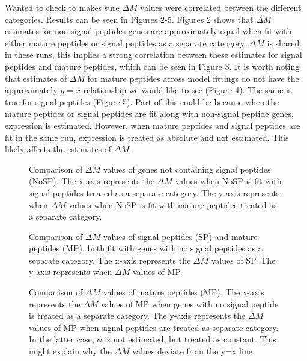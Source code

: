 \documentclass[11pt]{labbook}
\begin{document}
Wanted to check to makes sure $\Delta\mathit{M}$ values were correlated between the different categories. Results can be seen in Figures 2-5. Figures 2 shows that $\Delta\mathit{M}$ estimates for non-signal peptides genes are approximately equal when fit with either mature peptides or signal peptides as a separate cateogory. $\Delta\mathit{M}$ is shared in these runs, this implies a strong correlation between these estimates for signal peptides and mature peptides, which can be seen in Figure 3. It is worth noting that estimates of $\Delta\mathit{M}$ for mature peptides across model fittings do not have the approximately $y = x$ relationship we would like to see (Figure 4). The same is true for signal peptides (Figure 5). Part of this could be because when the mature peptides or signal peptides are fit along with non-signal peptide genes, expression is estimated. However, when mature peptides and signal peptides are fit in the same run, expression is treated as absolute and not estimated. This likely affects the estimates of $\Delta\mathit{M}$. \newline

\begin{figure}
\caption{Comparison of $\Delta\mathit{M}$ values of genes not containing signal peptides (NoSP). The x-axis represents the $\Delta\mathit{M}$ values when NoSP is fit with signal peptides treated as a separate category. The y-axis represents when $\Delta\mathit{M}$ values when NoSP is fit with mature peptides treated as a separate category.}
\end{figure}

\begin{figure}
\caption{Comparison of $\Delta\mathit{M}$ values of signal peptides (SP) and mature peptides (MP), both fit with genes with no signal peptides as a separate category. The x-axis represents the $\Delta\mathit{M}$ values of SP. The y-axis represents when $\Delta\mathit{M}$ values of MP.}
\end{figure}

\begin{figure}
\caption{Comparison of $\Delta\mathit{M}$ values of mature peptides (MP). The x-axis represents the $\Delta\mathit{M}$ values of MP when genes with no signal peptide is treated as a separate category. The y-axis represents the $\Delta\mathit{M}$ values of MP when signal peptides are treated as separate category. In the latter case, $\phi$ is not estimated, but treated as constant. This might explain why the $\Delta\mathit{M}$ values deviate from the y=x line.}
\end{figure}
\end{document}
